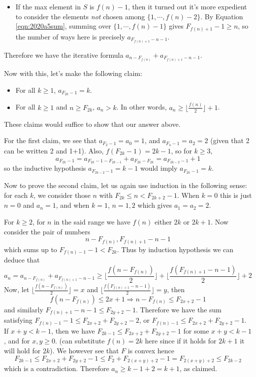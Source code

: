 \documentclass[11pt,a4paper]{article}
\newcommand{\<}{\langle}
\renewcommand{\>}{\rangle}
\begin{document}
\begin{enumerate}
\begin{itemize}
		\item If the max element in $S$ is $f(n)-1$, then it turned out it's more expedient to consider the elements \emph{not} chosen among $\{1, \cdots, f(n)-2\}$. 
		By Equation \ref{eqn:2020a5sum}, 
		summing over $\{1, \cdots, f(n)-1\}$ gives $F_{f(n)+1}-1\ge n$, 
		so the number of ways here is precisely $a_{F_{f(n)+1}-n-1}$. 
		
	\end{itemize}
    Therefore we have the iterative formula $a_{n-F_{f(n)}}+a_{F_{f(n)+1}-n-1}$. 
    
    Now with this, let's make the following claim: 
    \begin{itemize}
    	\item For all $k\ge 1$, $a_{F_{2k}-1}=k$. 
    	
    	\item For all $k\ge 1$ and $n\ge F_{2k}$, $a_n>k$. In other words, $a_{n}\ge \lfloor \frac{f(n)}{2}\rfloor+1$. 
    \end{itemize}
    These claims would suffice to show that our answer above. 
    
    For the first claim, we see that $a_{F_2-1}=a_0=1$, and $a_{F_4-1}=a_2=2$ (given that 2 can be written 2 and 1+1). 
    Also, $f(F_{2k}-1)=2k-1$, 
    so for $k\ge 3$, 
    \[a_{F_{2k}-1}=a_{F_{2k}-1-F_{2k-1}}+a_{F_{2k}-F_{2k}}=a_{F_{2k-2}-1}+1
    \]
    so the inductive hypothesis $a_{F_{2k-2}-1}=k-1$ would imply $a_{F_{2k}-1}=k$. 
    
    Now to prove the second claim, let us again use induction in the following sense: 
    for each $k$, we consider those $n$ with $F_{2k}\le n < F_{2k+2}-1$. 
    When $k=0$ this is just $n=0$ and $a_n=1$, and when $k=1$, $n=1, 2$ which gives $a_1=a_2=2$. 
    
    For $k\ge 2$, for $n$ in the said range we have $f(n)$ either $2k$ or $2k+1$. 
    Now consider the pair of numbers 
    \[
    n-F_{f(n)}, F_{f(n)+1}-n-1
    \]
    which sums up to $F_{f(n)-1}-1< F_{2k}$. Thus by induction hypothesis we can deduce that 
    \[a_n=a_{n-F_{f(n)}}+a_{F_{f(n)+1}-n-1}\ge 
    \lfloor\frac{f(n-F_{f(n)})}{2}\rfloor + \lfloor\frac{f(F_{f(n)+1}-n-1)}{2}\rfloor + 2
    \]
    Now, let $\lfloor\frac{f(n-F_{f(n)})}{2}\rfloor=x$ and $\lfloor\frac{f(F_{f(n)+1}-n-1)}{2}\rfloor =y$, 
    then 
    \[
    f(n-F_{f(n)})\le 2x+1 \Rightarrow n-F_{f(n)}\le F_{2x+2}-1
    \]
    and similarly $F_{f(n)+1}-n-1\le F_{2y+2}-1$. 
    Therefore we have the sum satisfying
    $F_{f(n)-1}-1\le F_{2x+2}+F_{2y+2}-2$, or $F_{f(n)-1}\le F_{2x+2}+F_{2y+2}-1$. 
    If $x+y<k-1$, then we have $F_{2k-1}\le F_{2x+2}+F_{2y+2}-1$ for some $x+y<k-1$, and for $x, y\ge 0$. 
    (can substitute $f(n)=2k$ here since if it holds for $2k+1$ it will hold for $2k$). 
    We however see that $F$ is convex hence 
    \[F_{2k-1}\le F_{2x+2}+F_{2y+2}-1\le F_2 + F_{2(x+y)+2}-1 = F_{2(x+y)+2}\le F_{2k-2}
    \]
    which is a contradiction. 
    Therefore $a_n\ge k-1+2=k+1$, as claimed. 
    

\end{enumerate}
\end{document}
